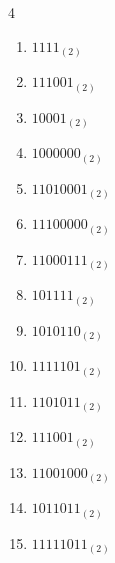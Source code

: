 \begin{multicols}{4}
\begin{enumerate}
        \phantom{$=163$}

  \item $1111_{(2)}$

        \phantom{$=15$}

\columnbreak %

  \item $111001_{(2)}$

        \phantom{$=57$}

  \item $10001_{(2)}$

        \phantom{$=17$}

  \item $1000000_{(2)}$

        \phantom{$=64$}

  \item $11010001_{(2)}$

        \phantom{$=209$}

  \item $11100000_{(2)}$

        \phantom{$=224$}

  \item $11000111_{(2)}$

        \phantom{$=199$}

  \item $101111_{(2)}$

        \phantom{$=47$}

  \item $1010110_{(2)}$

        \phantom{$=86$}

  \item $1111101_{(2)}$

        \phantom{$=125$}

  \item $1101011_{(2)}$

        \phantom{$=107$}

  \item $111001_{(2)}$

        \phantom{$=57$}

  \item $11001000_{(2)}$

        \phantom{$=200$}

  \item $1011011_{(2)}$

        \phantom{$=91$}

  \item $11111011_{(2)}$


\end{enumerate}
\end{multicols}
